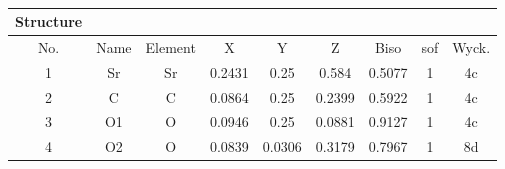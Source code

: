 \documentclass[11pt]{article}
\begin{document}
\begin{table}[htbp]
\begin{tabular}{cc}
		\end{tabular}%
		\\
		\begin{tabular}{ccccccccc}
			\toprule
			Structure &   &   &   &   &   &   &   &  \\
			\midrule
			No. & Name & Element & X & Y & Z & Biso & sof & Wyck. \\
			\midrule
			1 & Sr & Sr & 0.2431 & 0.25 & 0.584 & 0.5077 & 1 & 4c \\
			2 & C & C & 0.0864 & 0.25 & 0.2399 & 0.5922 & 1 & 4c \\
			3 & O1 & O & 0.0946 & 0.25 & 0.0881 & 0.9127 & 1 & 4c \\
			4 & O2 & O & 0.0839 & 0.0306 & 0.3179 & 0.7967 & 1 & 8d \\
			\bottomrule
		\end{tabular}%
		\label{tab:SrCO3_Appendix}%
	\end{table}%
	
\end{document}
